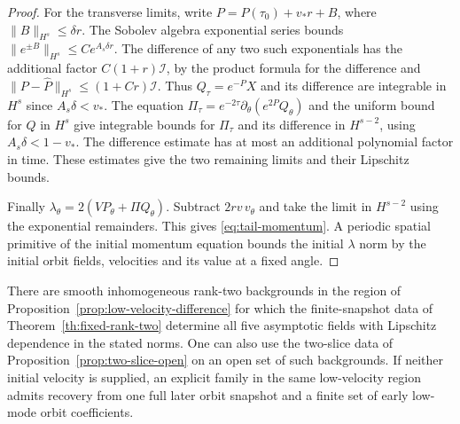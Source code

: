 \begin{proof}
For the transverse limits, write
$P=P(\tau_0)+v_*r+B$, where
$\|B\|_{H^s}\le\delta r$.
The Sobolev algebra exponential series bounds
$\|e^{\pm B}\|_{H^s}\le C e^{A_s\delta r}$.
The difference of any two such exponentials
has the additional factor
$C(1+r)\mathcal I$, by the product formula
for the difference and
$\|P-\widehat P\|_{H^s}\le(1+Cr)\mathcal I$.
Thus $Q_\tau=e^{-P}X$ and its difference
are integrable in $H^s$ since $A_s\delta<v_*$.
The equation
$\Pi_\tau=e^{-2\tau}\partial_\theta(e^{2P}Q_\theta)$
and the uniform bound for $Q$ in $H^s$ give
integrable bounds for $\Pi_\tau$ and its difference in
$H^{s-2}$, using $A_s\delta<1-v_*$.
The difference estimate has at most an additional
polynomial factor in time. These estimates give the
two remaining limits and their Lipschitz bounds.

Finally $\lambda_\theta=2(V P_\theta+\Pi Q_\theta)$.
Subtract $2rv\,v_\theta$ and take the limit
in $H^{s-2}$ using the exponential remainders.
This gives \eqref{eq:tail-momentum}.
A periodic spatial primitive of the initial
momentum equation bounds the initial $\lambda$
norm by the initial orbit fields, velocities
and its value at a fixed angle.
\end{proof}

\begin{proposition}
\label{prop:from-observations-to-tail}
There are smooth inhomogeneous rank-two
backgrounds in the region of
Proposition~\ref{prop:low-velocity-difference}
for which the finite-snapshot data of
Theorem~\ref{th:fixed-rank-two} determine all five
asymptotic fields with Lipschitz dependence
in the stated norms. One can also use the
two-slice data of Proposition~\ref{prop:two-slice-open}
on an open set of such backgrounds. If neither
initial velocity is supplied, an explicit family
in the same low-velocity region admits recovery
from one full later orbit snapshot and a finite
set of early low-mode orbit coefficients.
\end{proposition}

